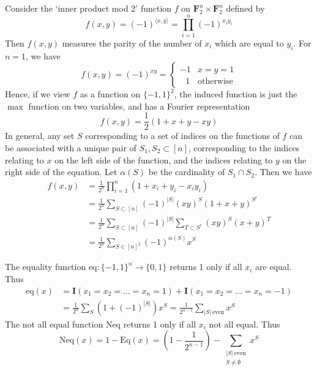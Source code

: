 \begin{example}
    Consider the `inner product mod 2' function $f$ on $\mathbf{F}_2^n \times \mathbf{F}_2^n$ defined by
    \[ f(x,y) = (-1)^{\langle x, y \rangle} = \prod_{i = 1}^n (-1)^{x_iy_i} \]
    Then $f(x,y)$ measures the parity of the number of $x_i$ which are equal to $y_i$. For $n = 1$, we have
    \[ f(x,y) = (-1)^{xy} = \begin{cases} -1 & x = y = 1 \\ \ \ \ 1 & \text{otherwise} \end{cases} \]
    Hence, if we view $f$ as a function on $\{ -1, 1 \}^2$, the induced function is just the $\max$ function on two variables, and has a Fourier representation
    \[ f(x,y) = \frac{1}{2}(1 + x + y - xy) \]
    In general, any set $S$ corresponding to a set of indices on the functions of $f$ can be associated with a unique pair of $S_1, S_2 \subset [n]$, corresponding to the indices relating to $x$ on the left side of the function, and the indices relating to $y$ on the right side of the equation. Let $\alpha(S)$ be the cardinality of $S_1 \cap S_2$. Then we have
    \begin{align*}
        f(x,y) &= \frac{1}{2^n} \prod_{i = 1}^n (1 + x_i + y_i - x_i y_i)\\
        &= \frac{1}{2^n} \sum_{S \subset [n]} (-1)^{|S|} (xy)^S (1 + x + y)^{S^c}\\
        &= \frac{1}{2^n} \sum_{S \subset [n]} (-1)^{|S|} \sum_{T \subset S^c} (xy)^S (x + y)^T\\
        &= \frac{1}{2^n} \sum_{S \in [n]^2} (-1)^{\alpha(S)} x^S
    \end{align*}
\end{example}

\begin{example}
    The equality function $\text{eq}: \{ -1, 1 \}^n \to \{ 0, 1 \}$ returns 1 only if all $x_i$ are equal. Thus
    \begin{align*}
        \text{eq}(x) &= \mathbf{I}(x_1 = x_2 = \dots = x_n = 1) + \mathbf{I}(x_1 = x_2 = \dots = x_n = -1)\\
        &= \frac{1}{2^n} \sum_S (1 + (-1)^{|S|}) x^S = \frac{1}{2^{n-1}} \sum_{|S|\ \text{even}} x^S
    \end{align*}
    The not all equal function $\text{Neq}$ returns 1 only if all $x_i$ not all equal. Thus
    \[ \text{Neq}(x) = 1 - \text{Eq}(x) = \left( 1 - \frac{1}{2^{n-1}} \right) - \sum_{\substack{|S|\ \text{even}\\S \neq \emptyset}} x^S \]
\end{example}

